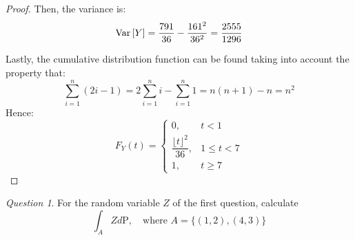 \documentclass[11pt]{article}
\theoremstyle{definition}
\theoremstyle{remark}
\theoremstyle{remark}
\newtheorem{question}{Question}
\begin{document}
\begin{proof}
  Then, the variance is:
  \begin{equation*}
    \V{Y} = \frac{791}{36} - \frac{161^2}{36^2} = \frac{2555}{1296}
  \end{equation*}

  Lastly, the cumulative distribution function can be found taking
  into account the property that:
  \begin{equation*}
    \sum_{i=1}^n (2i - 1) = 2\sum_{i=1}^ni - \sum_{i=1}^n 1 = n(n+1) - n = n^2
  \end{equation*}
  Hence:
  \begin{equation*}
    F_Y(t) =
    \begin{cases}
      0, &t < 1 \\
      \dfrac{\lfloor t \rfloor^2}{36}, &1 \le t < 7 \\
      1, &t \ge 7
    \end{cases}
  \end{equation*}
\end{proof}

\begin{question}
  For the random variable $Z$ of the first question, calculate
  \begin{equation*}
    \int_A Z d\mathrm{P}, \quad \text{where } A = \{(1,2), (4,3)\}
  \end{equation*}
\end{question}
\end{document}
